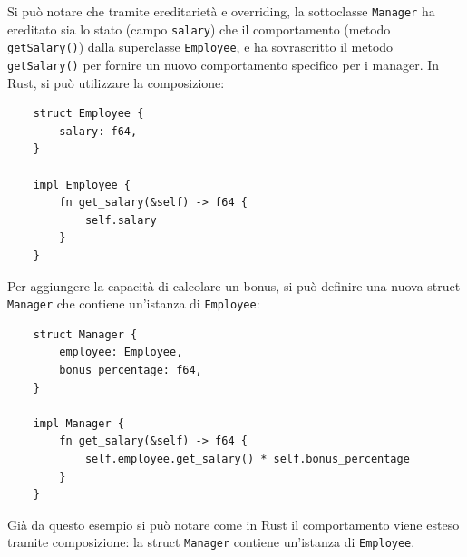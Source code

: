 Si può notare che tramite ereditarietà e overriding, la sottoclasse \texttt{Manager} ha ereditato sia lo stato (campo \texttt{salary}) che il comportamento (metodo \texttt{getSalary()}) dalla superclasse \texttt{Employee}, e ha sovrascritto il metodo \texttt{getSalary()} per fornire un nuovo comportamento specifico per i manager. In Rust, si può utilizzare la composizione:
\begin{verbatim}
    struct Employee {
        salary: f64,
    }

    impl Employee {
        fn get_salary(&self) -> f64 {
            self.salary
        }
    }
\end{verbatim}
Per aggiungere la capacità di calcolare un bonus, si può definire una nuova struct \texttt{Manager} che contiene un'istanza di \texttt{Employee}:
\begin{verbatim}
    struct Manager {
        employee: Employee,
        bonus_percentage: f64,
    }

    impl Manager {
        fn get_salary(&self) -> f64 {
            self.employee.get_salary() * self.bonus_percentage
        }
    }
\end{verbatim}
Già da questo esempio si può notare come in Rust il comportamento viene esteso tramite composizione: la struct \texttt{Manager} contiene un'istanza di \texttt{Employee}. 

